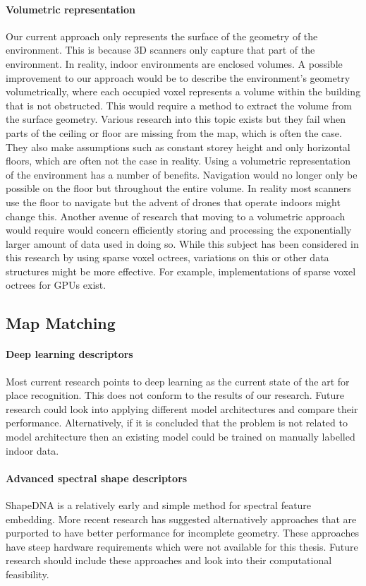 \paragraph{Volumetric representation}
Our current approach only represents the surface of the geometry of the environment. This is because 3D scanners only capture that part of the environment. In reality, indoor environments are enclosed volumes. A possible improvement to our approach would be to describe the environment's geometry volumetrically, where each occupied voxel represents a volume within the building that is not obstructed. This would require a method to extract the volume from the surface geometry. Various research into this topic exists but they fail when parts of the ceiling or floor are missing from the map, which is often the case. They also make assumptions such as constant storey height and only horizontal floors, which are often not the case in reality. Using a volumetric representation of the environment has a number of benefits. Navigation would no longer only be possible on the floor but throughout the entire volume. In reality most scanners use the floor to navigate but the advent of drones that operate indoors might change this. Another avenue of research that moving to a volumetric approach would require would concern efficiently storing and processing the exponentially larger amount of data used in doing so. While this subject has been considered in this research by using sparse voxel octrees, variations on this or other data structures might be more effective. For example, implementations of sparse voxel octrees for GPUs exist.

\subsection{Map Matching}

\paragraph{Deep learning descriptors}
Most current research points to deep learning as the current state of the art for place recognition. This does not conform to the results of our research. Future research could look into applying different model architectures and compare their performance. Alternatively, if it is concluded that the problem is not related to model architecture then an existing model could be trained on manually labelled indoor data.

\paragraph{Advanced spectral shape descriptors}
ShapeDNA is a relatively early and simple method for spectral feature embedding. More recent research has suggested alternatively approaches that are purported to have better performance for incomplete geometry. These approaches have steep hardware requirements which were not available for this thesis. Future research should include these approaches and look into their computational feasibility.

